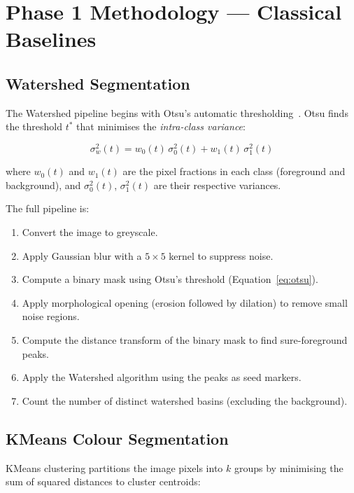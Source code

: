 \documentclass[12pt, a4paper]{article}
\begin{document}
\section{Phase 1 Methodology — Classical Baselines}

\subsection{Watershed Segmentation}

The Watershed pipeline begins with Otsu's automatic
thresholding~\cite{otsu1979threshold}.  Otsu finds the threshold $t^*$ that
minimises the \emph{intra-class variance}:

\begin{equation}
\sigma^2_w(t) = w_0(t)\,\sigma^2_0(t) + w_1(t)\,\sigma^2_1(t)
\label{eq:otsu}
\end{equation}

\noindent where $w_0(t)$ and $w_1(t)$ are the pixel fractions in each class
(foreground and background), and $\sigma^2_0(t)$, $\sigma^2_1(t)$ are their
respective variances.

The full pipeline is:
\begin{enumerate}
    \item Convert the image to greyscale.
    \item Apply Gaussian blur with a $5 \times 5$ kernel to suppress noise.
    \item Compute a binary mask using Otsu's threshold
          (Equation~\ref{eq:otsu}).
    \item Apply morphological opening (erosion followed by dilation) to
          remove small noise regions.
    \item Compute the distance transform of the binary mask to find
          sure-foreground peaks.
    \item Apply the Watershed algorithm using the peaks as seed markers.
    \item Count the number of distinct watershed basins (excluding the
          background).
\end{enumerate}

\subsection{KMeans Colour Segmentation}

KMeans clustering partitions the image pixels into $k$ groups by minimising
the sum of squared distances to cluster centroids:
\end{document}

